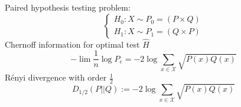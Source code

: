 \documentclass{beamer}
\begin{document}
\begin{frame}
Paired hypothesis testing problem:
\begin{equation*}
\begin{cases}
H_0: X \sim P_0=(P \times Q)\\
H_1: X \sim P_1=(Q \times P)
\end{cases}
\end{equation*}
Chernoff information for optimal test $\widehat{H}$
\begin{equation*}
-\lim \frac{1}{n}\log P_e = -2 \log \sum_{x\in \mathcal{X}} \sqrt{P(x)Q(x)}
\end{equation*}
Rényi divergence with order $\frac{1}{2}$
\begin{equation*}
D_{1/2}(P||Q) := -2 \log \sum_{x\in \mathcal{X}} \sqrt{P(x)Q(x)}
\end{equation*}
\end{frame}
\end{document}
